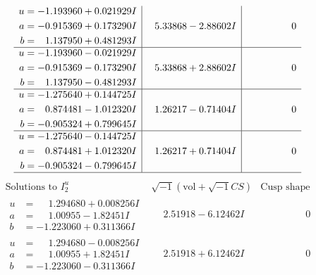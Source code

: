 \documentclass[1p]{elsarticle_modified}
\theoremstyle{definition}
\newcommand{\I}{\sqrt{-1}}
\begin{document}
$$\begin{array}{c|c|c}
\begin{aligned}
u &= -1.193960 + 0.021929 I \\
a &= -0.915369 + 0.173290 I \\
b &= \phantom{-}1.137950 + 0.481293 I\end{aligned}
 & \phantom{-}5.33868 - 2.88602 I & \phantom{-0.000000 } 0 \\ \hline\begin{aligned}
u &= -1.193960 - 0.021929 I \\
a &= -0.915369 - 0.173290 I \\
b &= \phantom{-}1.137950 - 0.481293 I\end{aligned}
 & \phantom{-}5.33868 + 2.88602 I & \phantom{-0.000000 } 0 \\ \hline\begin{aligned}
u &= -1.275640 + 0.144725 I \\
a &= \phantom{-}0.874481 - 1.012320 I \\
b &= -0.905324 + 0.799645 I\end{aligned}
 & \phantom{-}1.26217 - 0.71404 I & \phantom{-0.000000 } 0 \\ \hline\begin{aligned}
u &= -1.275640 - 0.144725 I \\
a &= \phantom{-}0.874481 + 1.012320 I \\
b &= -0.905324 - 0.799645 I\end{aligned}
 & \phantom{-}1.26217 + 0.71404 I & \phantom{-0.000000 } 0\\
 \hline 
 \end{array}$$\newpage$$\begin{array}{c|c|c}  
\text{Solutions to }I^u_{2}& \I (\text{vol} + \sqrt{-1}CS) & \text{Cusp shape}\\
 \hline 
\begin{aligned}
u &= \phantom{-}1.294680 + 0.008256 I \\
a &= \phantom{-}1.00955 - 1.82451 I \\
b &= -1.223060 + 0.311366 I\end{aligned}
 & \phantom{-}2.51918 - 6.12462 I & \phantom{-0.000000 } 0 \\ \hline\begin{aligned}
u &= \phantom{-}1.294680 - 0.008256 I \\
a &= \phantom{-}1.00955 + 1.82451 I \\
b &= -1.223060 - 0.311366 I\end{aligned}
 & \phantom{-}2.51918 + 6.12462 I & \phantom{-0.000000 } 0 \\ \hline\begin{aligned}

\end{aligned}
\end{array}$$
\end{document}
